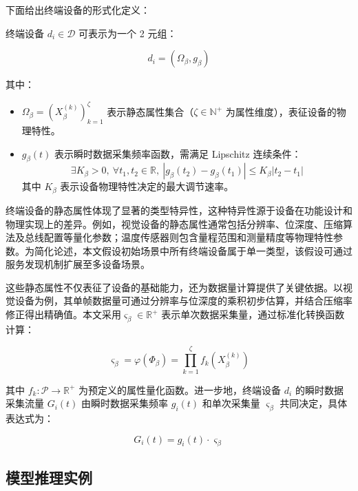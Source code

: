 下面给出终端设备的形式化定义：

\begin{definition}[终端设备]
\label{def:device}
终端设备 $d_i \in \mathcal{D}$ 可表示为一个 2 元组：
\end{definition}

$$
d_i = (\Omega_\beta, g_\beta)
$$

其中：
\begin{itemize}
    \item $\Omega_\beta = (X^{(k)}_\beta)_{k=1}^{\zeta}$ 表示静态属性集合（$\zeta \in \mathbb{N}^+$ 为属性维度），表征设备的物理特性。
    \item $g_\beta(t)$ 表示瞬时数据采集频率函数，需满足 Lipschitz 连续条件：
        \begin{equation}
        \exists K_\beta > 0,\ \forall t_1, t_2 \in \mathbb{R},\ |g_\beta(t_2) - g_\beta(t_1)| \leq K_\beta |t_2 - t_1|
        \end{equation}
        其中 $K_\beta$ 表示设备物理特性决定的最大调节速率。
\end{itemize}

终端设备的静态属性体现了显著的类型特异性，这种特异性源于设备在功能设计和物理实现上的差异。例如，视觉设备的静态属性通常包括分辨率、位深度、压缩算法及总线配置等量化参数；温度传感器则包含量程范围和测量精度等物理特性参数。为简化论述，本文假设初始场景中所有终端设备属于单一类型，该假设可通过服务发现机制扩展至多设备场景。

这些静态属性不仅表征了设备的基础能力，还为数据量计算提供了关键依据。以视觉设备为例，其单帧数据量可通过分辨率与位深度的乘积初步估算，并结合压缩率修正得出精确值。本文采用$\varsigma_\beta \in \mathbb{R}^+$ 表示单次数据采集量，通过标准化转换函数计算：

\begin{equation}
\varsigma_\beta = \varphi(\Phi_\beta) = \prod_{k=1}^{\zeta} f_k(X^{(k)}_\beta)
\end{equation}

其中 $f_k: \mathcal{P} \to \mathbb{R}^+$ 为预定义的属性量化函数。进一步地，终端设备 $d_i$ 的瞬时数据采集流量 $G_i(t)$ 由瞬时数据采集频率 $g_i(t)$ 和单次采集量 $\varsigma_\beta$ 共同决定，具体表达式为：

\begin{equation}
G_i(t) = g_i(t) \cdot \varsigma_\beta
\end{equation}

\subsection{模型推理实例}

